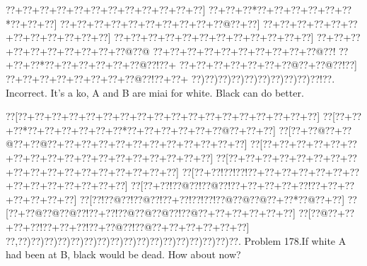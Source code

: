 \documentclass[a5paper]{article}
\begin{document}
\begin{center}
{\goo
\0??+\0??+\0??+\0??+\0??+\0??+\0??+\0??+\0??+\0??+\0??+\0??]
\0??+\0??+\0??*\0??+\0??+\0??+\0??+\0??+\0??*\0??+\0??+\0??]
\0??+\0??+\0??+\0??+\0??+\0??+\0??+\0??+\0??+\0??@\0??+\0??]
\0??+\0??+\0??+\0??+\0??+\0??+\0??+\0??+\0??+\0??+\0??+\0??]
\0??+\0??+\0??+\0??+\0??+\0??+\0??+\0??+\0??+\0??+\0??+\0??]
\0??+\0??+\0??+\0??+\0??+\0??+\0??+\0??+\0??+\0??@\0??@
\0??+\0??+\0??+\0??+\0??+\0??+\0??+\0??+\0??+\0??@\0??!
\0??+\0??+\0??*\0??+\0??+\0??+\0??+\0??+\0??@\0??!\0??+
\0??+\0??+\0??+\0??+\0??+\0??+\0??@\0??+\0??@\0??!\0??]
\0??+\0??+\0??+\0??+\0??+\0??+\0??+\0??@\0??!\0??+\0??+
\0??)\0??)\0??)\0??)\0??)\0??)\0??)\0??)\0??)\0??!\0??.
}
Incorrect. It's a ko, A and B are miai for white. Black can do better.

\end{center}
\newpage
\begin{center}
{\goo
\0??[\0??+\0??+\0??+\0??+\0??+\0??+\0??+\0??+\0??+\0??+\0??+\0??+\0??+\0??+\0??+\0??+\0??+\0??]
\0??[\0??+\0??+\0??*\0??+\0??+\0??+\0??+\0??+\0??*\0??+\0??+\0??+\0??+\0??+\0??@\0??+\0??+\0??]
\0??[\0??+\0??@\0??+\0??@\0??+\0??@\0??+\0??+\0??+\0??+\0??+\0??+\0??+\0??+\0??+\0??+\0??+\0??]
\0??[\0??+\0??+\0??+\0??+\0??+\0??+\0??+\0??+\0??+\0??+\0??+\0??+\0??+\0??+\0??+\0??+\0??+\0??]
\0??[\0??+\0??+\0??+\0??+\0??+\0??+\0??+\0??+\0??+\0??+\0??+\0??+\0??+\0??+\0??+\0??+\0??+\0??]
\0??[\0??+\0??!\0??!\0??!\0??+\0??+\0??+\0??+\0??+\0??+\0??+\0??+\0??+\0??+\0??+\0??+\0??+\0??]
\0??[\0??+\0??!\0??@\0??!\0??@\0??!\0??+\0??+\0??+\0??+\0??!\0??+\0??+\0??+\0??+\0??+\0??+\0??]
\0??[\0??!\0??@\0??!\0??@\0??!\0??+\0??!\0??!\0??!\0??@\0??@\0??@\0??+\0??*\0??@\0??+\0??]
\0??[\0??+\0??@\0??@\0??@\0??!\0??+\0??!\0??@\0??@\0??@\0??!\0??@\0??+\0??+\0??+\0??+\0??+\0??]
\0??[\0??@\0??+\0??+\0??+\0??!\0??+\0??+\0??!\0??+\0??@\0??!\0??@\0??+\0??+\0??+\0??+\0??+\0??]
\0??,\0??)\0??)\0??)\0??)\0??)\0??)\0??)\0??)\0??)\0??)\0??)\0??)\0??)\0??)\0??)\0??)\0??.
}
Problem 178.If white A had been at B, black would be dead. How about now?

\end{center}
\end{document}
